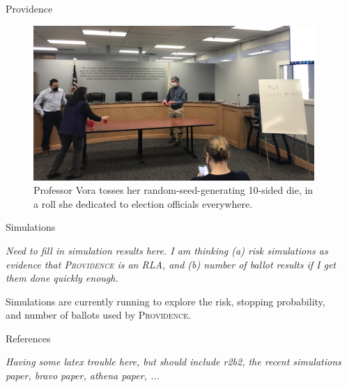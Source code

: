 \documentclass[final]{beamer}
\newcommand{\Prov}{\textsc{Providence}\xspace}
\newlength{\sepwidth}
\newlength{\colwidth}
\newcommand{\separatorcolumn}{\begin{column}{\sepwidth}\end{column}}
\begin{document}
\begin{frame}[t]
\begin{columns}[t]
\begin{column}{\colwidth}
\begin{block}{Providence}
\begin{figure}
\includegraphics[width=1.0\textwidth]{dice.jpg}
\caption{Professor Vora tosses her random-seed-generating 10-sided die, in a roll she dedicated to election officials everywhere.}
\end{figure}

\end{block}

\begin{block}{Simulations}

\emph{Need to fill in simulation results here. I am thinking (a) risk simulations as evidence that \Prov is an RLA, and (b) number of ballot results if I get them done quickly enough.}

Simulations are currently running to explore the risk, stopping probability, and number of ballots used by \Prov.

\end{block}



  \begin{block}{References}

    
    
    \emph{Having some latex trouble here, but should include r2b2, the recent simulations paper, bravo paper, athena paper, ...}

  \end{block}


\end{column}

\separatorcolumn

\end{columns}

\end{frame}
\end{document}
